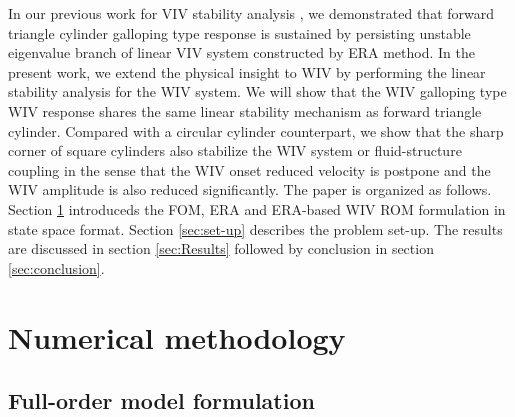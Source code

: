 In our previous work for VIV stability analysis \cite{yao_jfm_1}, we demonstrated that 
forward triangle cylinder galloping type response is sustained by persisting unstable eigenvalue branch 
of linear VIV system constructed by ERA method. In the present work, we extend the physical insight to 
WIV by performing the linear stability analysis for the WIV system. We will show that the WIV 
galloping type WIV response shares the same linear stability mechanism as forward triangle cylinder. 
Compared with a circular cylinder counterpart, we show that the sharp corner of square cylinders also stabilize the WIV 
system or fluid-structure coupling in the sense that the WIV onset reduced velocity is postpone and the WIV
amplitude is also reduced significantly. 
The paper is organized as follows. Section  \ref{sec:Numeric method} introduceds the FOM, ERA and ERA-based WIV ROM 
formulation in state space format. Section \ref{sec:set-up} describes the problem set-up. The results are discussed 
in section \ref{sec:Results} followed by conclusion in section \ref{sec:conclusion}. 

\section{Numerical methodology}\label{sec:Numeric method}
\subsection{Full-order model formulation}

